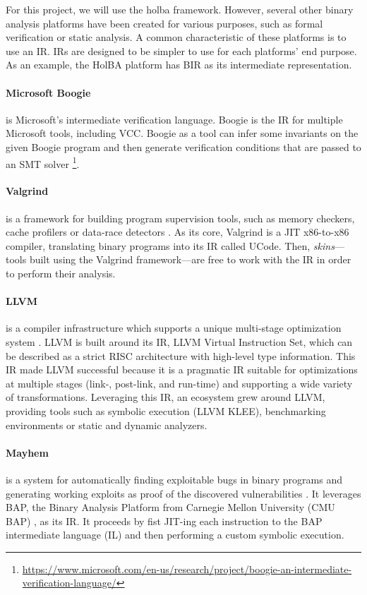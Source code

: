 \documentclass{kththesis}
\begin{document}
For this project, we will use the \gls{holba} framework. However, several other binary analysis platforms have been created for various purposes, such as formal verification or static analysis. A common characteristic of these platforms is to use an \gls{IR}. IRs are designed to be simpler to use for each platforms' end purpose. As an example, the HolBA platform has BIR as its intermediate representation.

\paragraph{Microsoft Boogie} is Microsoft's intermediate verification language. Boogie is the IR for multiple Microsoft tools, including VCC. Boogie as a tool can infer some invariants on the given Boogie program and then generate verification conditions that are passed to an SMT solver \footnote{\url{https://www.microsoft.com/en-us/research/project/boogie-an-intermediate-verification-language/}}.

\paragraph{Valgrind} is a framework for building program supervision tools, such as memory checkers, cache profilers or data-race detectors \cite{nethercote_valgrind:_2003}. As its core, Valgrind is a JIT x86-to-x86 compiler, translating binary programs into its IR called UCode. Then, \textit{skins}---tools built using the Valgrind framework---are free to work with the IR in order to perform their analysis.

\paragraph{LLVM} is a compiler infrastructure which supports a unique multi-stage optimization system \cite{lattner_llvm:_2002}. LLVM is built around its \gls{IR}, LLVM Virtual Instruction Set, which can be described as a strict RISC architecture with high-level type information. This IR made LLVM successful because it is a pragmatic IR suitable for optimizations at multiple stages (link-, post-link, and run-time) and supporting a wide variety of transformations. Leveraging this IR, an ecosystem grew around LLVM, providing tools such as symbolic execution (LLVM KLEE), benchmarking environments or static and dynamic analyzers.

\paragraph{Mayhem} is a system for automatically finding exploitable bugs in binary programs and generating working exploits as proof of the discovered vulnerabilities \cite{cha_unleashing_2012}. It leverages BAP, the Binary Analysis Platform from Carnegie Mellon University (CMU BAP) \cite{brumley_bap:_2011}, as its IR. It proceeds by fist JIT-ing each instruction to the BAP intermediate language (IL) and then performing a custom symbolic execution.
\end{document}
